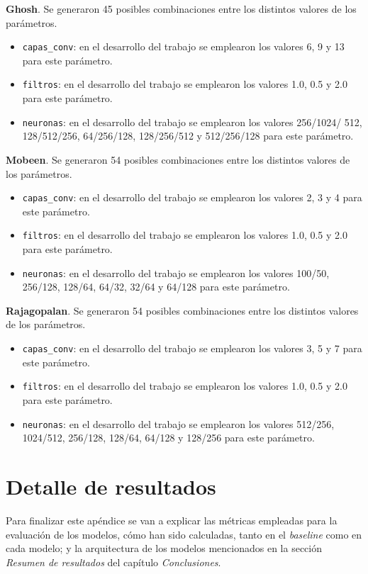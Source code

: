 \textbf{Ghosh}. Se generaron 45 posibles combinaciones entre los distintos valores de los parámetros.
\begin{itemize}
    \item \texttt{capas\_conv}: en el desarrollo del trabajo se emplearon los valores 6, 9 y 13 para este parámetro.
    \item \texttt{filtros}: en el desarrollo del trabajo se emplearon los valores 1.0, 0.5 y 2.0 para este parámetro.
    \item \texttt{neuronas}: en el desarrollo del trabajo se emplearon los valores 256/1024/ 512, 128/512/256, 64/256/128, 128/256/512 y 512/256/128 para este parámetro.
\end{itemize}

\textbf{Mobeen}. Se generaron 54 posibles combinaciones entre los distintos valores de los parámetros.
\begin{itemize}
    \item \texttt{capas\_conv}: en el desarrollo del trabajo se emplearon los valores 2, 3 y 4 para este parámetro.
    \item \texttt{filtros}: en el desarrollo del trabajo se emplearon los valores 1.0, 0.5 y 2.0 para este parámetro.
    \item \texttt{neuronas}: en el desarrollo del trabajo se emplearon los valores 100/50, 256/128, 128/64, 64/32, 32/64 y 64/128 para este parámetro.
\end{itemize}

\textbf{Rajagopalan}. Se generaron 54 posibles combinaciones entre los distintos valores de los parámetros.
\begin{itemize}
    \item \texttt{capas\_conv}: en el desarrollo del trabajo se emplearon los valores 3, 5 y 7 para este parámetro.
    \item \texttt{filtros}: en el desarrollo del trabajo se emplearon los valores 1.0, 0.5 y 2.0 para este parámetro.
    \item \texttt{neuronas}: en el desarrollo del trabajo se emplearon los valores 512/256, 1024/512, 256/128, 128/64, 64/128 y 128/256 para este parámetro.
\end{itemize}

\section{Detalle de resultados}

Para finalizar este apéndice se van a explicar las métricas empleadas para la evaluación de los modelos, cómo han sido calculadas, tanto en el \textit{baseline} como en cada modelo; y la arquitectura de los modelos mencionados en la sección \textit{Resumen de resultados} del capítulo \textit{Conclusiones}.

